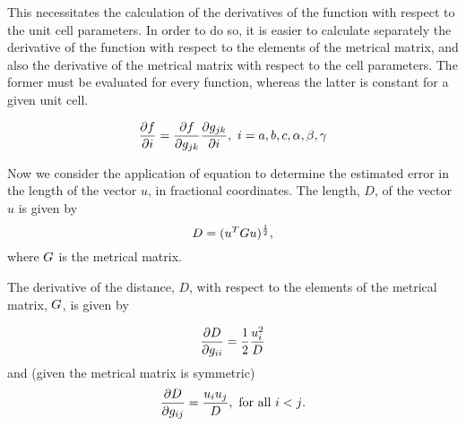 \documentclass[pdf]{iucr}
\begin{document}
This necessitates the calculation of the derivatives of the function with respect to the unit cell parameters. In order to do so, it is easier to calculate separately the derivative of the function with respect to the elements of the metrical matrix, and also the derivative of the metrical matrix with respect to the cell parameters. The former must be evaluated for every function, whereas the latter is constant for a given unit cell.

\begin{equation}
\frac{\partial f}{\partial i} = \frac{\partial f}{\partial g_{jk}}\frac{\partial g_{jk}}{\partial i},\ i=a, b, c, \alpha, \beta, \gamma
\label{eqn:df_dcell}
\end{equation}

Now we consider the application of equation  to determine the estimated error in the length of the vector $u$, in fractional coordinates. The length, $D$, of the  vector $u$ is given by
\begin{equation}
D = (u^T G u)^\frac{1}{2}
\label{eqn:bond_length},
\end{equation}
where $G$ is the metrical matrix.

The derivative of the distance, $D$, with respect to the elements of the metrical matrix, $G$, is given by
%

\begin{equation}
\frac{\partial D}{\partial g_{ii}} = \frac{1}{2} \frac{u_i^2}{D}
\label{eqn:d_distance_d_gii}
\end{equation}
and (given the metrical matrix is symmetric)
\begin{equation}
\frac{\partial D}{\partial g_{ij}} = \frac{u_i u_j}{D},\ \text{for all $i<j$}.
\label{eqn:d_distance_d_gij}
\end{equation}
\end{document}
